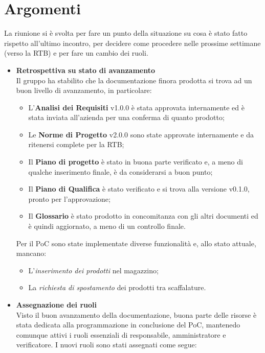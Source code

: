 \section{Argomenti} \label{sec:argomenti}
La riunione si è svolta per fare un punto della situazione su cosa è stato fatto rispetto all'ultimo incontro, per decidere come procedere nelle prossime settimane (verso la RTB) e per fare un cambio dei ruoli.
    \begin{itemize}
        \item \textbf{Retrospettiva su stato di avanzamento} \\
        Il gruppo ha stabilito che la documentazione finora prodotta si trova ad un buon livello di avanzamento, in particolare:
        \begin{itemize}
            \item L'\textbf{Analisi dei Requisiti} v1.0.0 è stata approvata internamente ed è stata inviata all'azienda per una conferma di quanto prodotto;
            \item Le \textbf{Norme di Progetto} v2.0.0 sono state approvate internamente e da ritenersi complete per la RTB;
            \item Il \textbf{Piano di progetto} è stato in buona parte verificato e, a meno di qualche inserimento finale, è da considerarsi a buon punto;
            \item Il \textbf{Piano di Qualifica} è stato verificato e si trova alla versione v0.1.0, pronto per l'approvazione;
            \item Il \textbf{Glossario} è stato prodotto in concomitanza con gli altri documenti ed è quindi aggiornato, a meno di un controllo finale.
        \end{itemize}
        Per il PoC sono state implementate diverse funzionalità e, allo stato attuale, mancano:
        \begin{itemize}
            \item L'\textit{inserimento dei prodotti} nel magazzino;
            \item La \textit{richiesta di spostamento} dei prodotti tra scaffalature.
        \end{itemize}        
        \item \textbf{Assegnazione dei ruoli} \\
        Visto il buon avanzamento della documentazione, buona parte delle risorse è stata dedicata alla programmazione in conclusione del PoC, mantenedo comunque attivi i ruoli essenziali di responsabile, amministratore e verificatore. I nuovi ruoli sono stati assegnati come segue:

\end{itemize}
